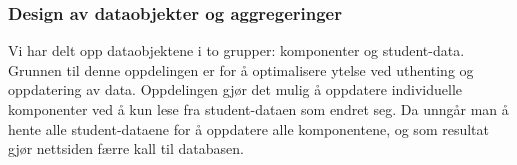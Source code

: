 \subsubsection{Design av dataobjekter og aggregeringer}

Vi har delt opp dataobjektene i to grupper: komponenter og student-data. Grunnen til denne oppdelingen er for å optimalisere ytelse ved uthenting og oppdatering av data. Oppdelingen gjør det mulig å oppdatere individuelle komponenter ved å kun lese fra student-dataen som endret seg. Da unngår man å hente alle student-dataene for å oppdatere alle komponentene, og som resultat gjør nettsiden færre kall til databasen.





